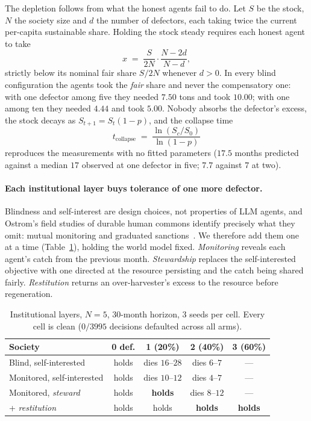 \documentclass[manuscript,screen,review]{acmart}
\begin{document}
{The depletion follows from what the honest agents fail to do. Let $S$ be the
stock, $N$ the society size and $d$ the number of defectors, each taking twice the
current per-capita sustainable share. Holding the stock steady requires each
honest agent to take
\begin{equation}
x \;=\; \frac{S}{2N}\cdot\frac{N-2d}{N-d},
\label{eq:hold}
\end{equation}
strictly below its nominal fair share $S/2N$ whenever $d>0$. In every blind
configuration the agents took the \emph{fair} share and never the compensatory
one: with one defector among five they needed $7.50$ tons and took $10.00$; with
one among ten they needed $4.44$ and took $5.00$. Nobody absorbs the defector's
excess, the stock decays as $S_{t+1}=S_t(1-p)$, and the collapse time
\begin{equation}
t_{\mathrm{collapse}} \;=\; \frac{\ln (S_c/S_0)}{\ln (1-p)}
\label{eq:tcollapse}
\end{equation}
reproduces the measurements with no fitted parameters ($17.5$ months predicted
against a median $17$ observed at one defector in five; $7.7$ against $7$ at two).

\paragraph{Each institutional layer buys tolerance of one more defector.}
Blindness and self-interest are design choices, not properties of LLM agents, and
Ostrom's field studies of durable human commons identify precisely what they omit:
mutual monitoring and graduated sanctions~\cite{ostrom1990}. We therefore add
them one at a time (Table~\ref{tab:arms}), holding the world model fixed.
\emph{Monitoring} reveals each agent's catch from the previous month.
\emph{Stewardship} replaces the self-interested objective with one directed at the
resource persisting and the catch being shared fairly. \emph{Restitution} returns
an over-harvester's excess to the resource before regeneration.

\begin{table}[t]
\caption{Institutional layers, $N{=}5$, $30$-month horizon, 3 seeds per cell.
Every cell is clean ($0/3995$ decisions defaulted across all arms).}
\label{tab:arms}
\small
\begin{tabular}{@{}p{5.4cm}cccc@{}}
\toprule
\textbf{Society} & \textbf{0 def.} & \textbf{1 (20\%)} & \textbf{2 (40\%)} & \textbf{3 (60\%)} \\
\midrule
Blind, self-interested & holds & dies $16$--$28$ & dies $6$--$7$ & --- \\
Monitored, self-interested & holds & dies $10$--$12$ & dies $4$--$7$ & --- \\
Monitored, \emph{steward} & holds & \textbf{holds} & dies $8$--$12$ & --- \\
\;\;+ \emph{restitution} & holds & holds & \textbf{holds} & \textbf{holds} \\
\bottomrule
\end{tabular}
\end{table}

}
\end{document}
